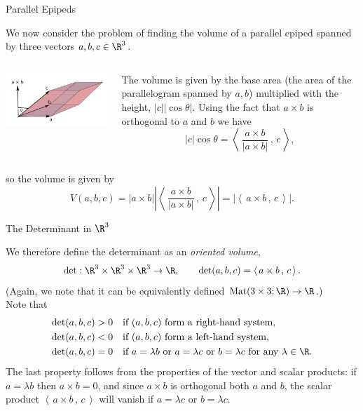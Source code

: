 \documentclass[smaller,hyperref={CJKbookmarks=true}]{beamer}
\newcommand{\scp}[2]{\left\langle\,#1\,,\,#2\,\right\rangle} \newcommand{\scpp}{\langle\,\cdot\,,\,\cdot\,\rangle}
\begin{document}
\begin{frame}[t,shrink]{Parallel Epipeds}
\begin{spacing}{1.05}
We now consider the problem of finding the volume of a parallel epiped spanned by three vectors
$a,b,c\in\R^3$.\\[8pt]
\begin{columns}[onlytextwidth]
\begin{column}{0.5\textwidth}
\includegraphics[width=\columnwidth]{cube.jpg}
\end{column}
\begin{column}{0.5\textwidth}
The volume is given by the base area
(the area of the parallelogram spanned by $a, b$) multiplied with the height, $|c||\cos\theta|$. Using the fact that $a\times b$ is orthogonal to $a$ and $b$ we have
\[|c|\cos\theta=\scp{\frac{a\times b}{|a\times b|}}{c},\]
\end{column}
\end{columns}
\vspace*{6pt}
so the volume is given by
\[V(a,b,c)=|a\times b|\left|\scp{\frac{a\times b}{|a\times b|}}{c}\right|=|\scp{a\times b}{c}|.\]
\end{spacing}
\end{frame}
\begin{frame}[t,shrink]{The Determinant in $\R^3$}
\begin{spacing}{1.1}
We therefore define the determinant as an \emph{oriented volume},
\begin{equation}\label{eq28}
  \det:\R^3\times\R^3\times\R^3\to\R,\qquad\det(a,b,c)=\scp{a\times b}{c}.
\end{equation}
(Again, we note that it can be equivalently defined $\text{Mat}(3\times 3;\R)\to\R$.) \\Note that
\begin{align}\label{eq29}
  \det(a,b,c)>0~~~ & \text{if}~(a,b,c)~\text{form a right-hand system,} \\
  \det(a,b,c)<0~~~ & \text{if}~(a,b,c)~\text{form a left-hand system,} \\
  \det(a,b,c)=0~~~ &\text{if}~a=\lambda b~\text{or}~a=\lambda c~\text{or}~b=\lambda c~\text{for any}~\lambda\in\R. \label{1.7.8}
\end{align}
The last property follows from the properties of the vector and scalar
products: if $a=\lambda b$ then $a\times b=0$, and since $a\times b$ is orthogonal both $a$ and $b$, the scalar product $\scp{a\times b}{c}$ will vanish if $a=\lambda c$ or $b=\lambda c$.
\end{spacing}
\end{frame}
\end{document}
